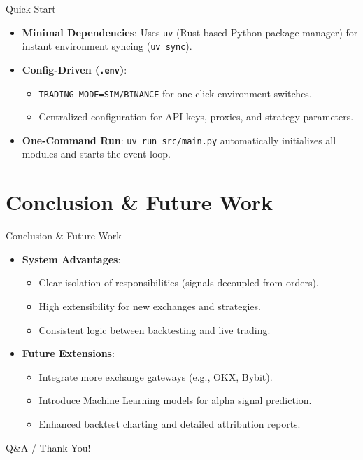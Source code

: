 \documentclass{beamer}
\begin{document}
\begin{frame}{Quick Start}
    \begin{itemize}
        \item \textbf{Minimal Dependencies}: Uses \texttt{uv} (Rust-based Python package manager) for instant environment syncing (\texttt{uv sync}).
        \item \textbf{Config-Driven (\texttt{.env})}:
        \begin{itemize}
            \item \texttt{TRADING\_MODE=SIM/BINANCE} for one-click environment switches.
            \item Centralized configuration for API keys, proxies, and strategy parameters.
        \end{itemize}
        \item \textbf{One-Command Run}: \texttt{uv run src/main.py} automatically initializes all modules and starts the event loop.
    \end{itemize}
\end{frame}

\section{Conclusion \& Future Work}

\begin{frame}{Conclusion \& Future Work}
    \begin{itemize}
        \item \textbf{System Advantages}:
        \begin{itemize}
            \item Clear isolation of responsibilities (signals decoupled from orders).
            \item High extensibility for new exchanges and strategies.
            \item Consistent logic between backtesting and live trading.
        \end{itemize}
        \item \textbf{Future Extensions}:
        \begin{itemize}
            \item Integrate more exchange gateways (e.g., OKX, Bybit).
            \item Introduce Machine Learning models for alpha signal prediction.
            \item Enhanced backtest charting and detailed attribution reports.
        \end{itemize}
    \end{itemize}
\end{frame}

\begin{frame}
    \begin{center}
        {\Huge\calligra Q\&A / Thank You!}
    \end{center}
\end{frame}
\end{document}
